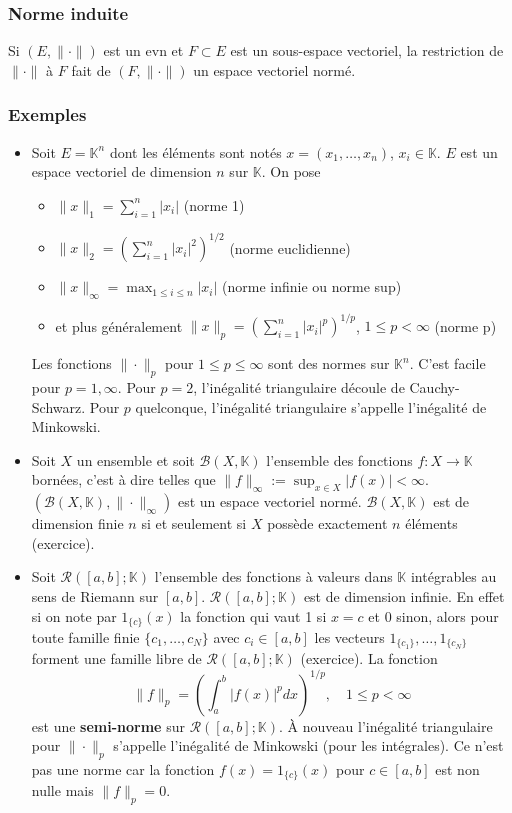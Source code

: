 \documentclass{article}
\newcommand{\K}{\mathbb{K}}
\begin{document}
\subsubsection{Norme induite}
Si $(E, \|\cdot\|)$ est un evn et $F \subset E$ est un sous-espace vectoriel, la restriction de $\|\cdot\|$ à $F$ fait de $(F, \|\cdot\|)$ un espace vectoriel normé.

\subsubsection{Exemples}
\begin{itemize}
    \item Soit $E = \K^n$ dont les éléments sont notés $x = (x_1, \dots, x_n)$, $x_i \in \K$. $E$ est un espace vectoriel de dimension $n$ sur $\K$. On pose
    \begin{itemize}
        \item $\|x\|_1 = \sum_{i=1}^n |x_i|$ (norme 1)
        \item $\|x\|_2 = \left(\sum_{i=1}^n |x_i|^2\right)^{1/2}$ (norme euclidienne)
        \item $\|x\|_\infty = \max_{1 \leq i \leq n} |x_i|$ (norme infinie ou norme sup)
        \item et plus généralement $\|x\|_p = \left(\sum_{i=1}^n |x_i|^p\right)^{1/p}$, $1 \leq p < \infty$ (norme p)
    \end{itemize}
    Les fonctions $\|\cdot\|_p$ pour $1 \leq p \leq \infty$ sont des normes sur $\K^n$. C'est facile pour $p = 1, \infty$. Pour $p=2$, l'inégalité triangulaire découle de Cauchy-Schwarz. Pour $p$ quelconque, l'inégalité triangulaire s'appelle l'inégalité de Minkowski.

    \item Soit $X$ un ensemble et soit $\mathcal{B}(X, \K)$ l'ensemble des fonctions $f : X \to \K$ bornées, c'est à dire telles que $\|f\|_\infty := \sup_{x \in X} |f(x)| < \infty$. $(\mathcal{B}(X, \K), \|\cdot\|_\infty)$ est un espace vectoriel normé.
    $\mathcal{B}(X, \K)$ est de dimension finie $n$ si et seulement si $X$ possède exactement $n$ éléments (exercice).

    \item Soit $\mathcal{R}([a, b]; \K)$ l'ensemble des fonctions à valeurs dans $\K$ intégrables au sens de Riemann sur $[a, b]$. $\mathcal{R}([a, b]; \K)$ est de dimension infinie. En effet si on note par $1_{\{c\}}(x)$ la fonction qui vaut 1 si $x = c$ et 0 sinon, alors pour toute famille finie $\{c_1, \dots, c_N\}$ avec $c_i \in [a, b]$ les vecteurs $1_{\{c_1\}}, \dots, 1_{\{c_N\}}$ forment une famille libre de $\mathcal{R}([a, b]; \K)$ (exercice).
    La fonction
    \[ \|f\|_p = \left(\int_a^b |f(x)|^p dx\right)^{1/p}, \quad 1 \leq p < \infty \]
    est une \textbf{semi-norme} sur $\mathcal{R}([a, b]; \K)$. À nouveau l'inégalité triangulaire pour $\|\cdot\|_p$ s'appelle l'inégalité de Minkowski (pour les intégrales). Ce n'est pas une norme car la fonction $f(x) = 1_{\{c\}}(x)$ pour $c \in [a, b]$ est non nulle mais $\|f\|_p = 0$.


\end{itemize}
\end{document}
